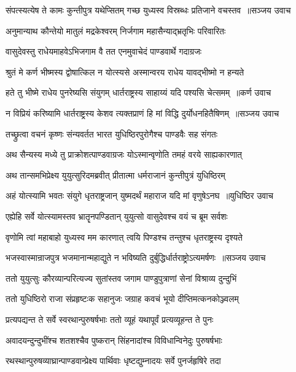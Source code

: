 \threelineshloka
{संपत्स्यत्येष ते कामः कुन्तीपुत्र यथेप्सितम्}
{गच्छ युध्यस्व विस्रब्धः प्रतिजाने वचस्तव ॥सञ्जय उवाच}
{}


\twolineshloka
{अनुमान्याथ कौन्तेयो मातुलं मद्रकेश्वरम्}
{निर्जगाम महासैन्याद्भ्रतृभिः परिवारितः}


\twolineshloka
{वासुदेवस्तु राधेयमाहवेऽभिजगाम वै}
{तत एनमुवाचेदं पाण्डवार्थे गदाग्रजः}


\twolineshloka
{श्रुतं मे कर्ण भीष्मस्य द्वोषात्किल न योत्स्यसे}
{अस्मान्वरय राधेय यावद्भीष्मो न हन्यते}


\threelineshloka
{हते तु भीष्मे राधेय पुनरेष्यसि संयुगम्}
{धार्तराष्ट्रस्य साहाय्यं यदि पश्यसि चेत्समम् ॥कर्ण उवाच}
{}


\threelineshloka
{न विप्रियं करिष्यामि धार्तराष्ट्रस्य केशव}
{त्यक्तप्राणं हि मां विद्धि दुर्योधनहितैषिणम् ॥सञ्जय उवाच}
{}


\twolineshloka
{तच्छ्रुत्वा वचनं कृष्णः संन्यवर्तत भारत}
{युधिष्ठिरपुरोगैश्च पाण्डवैः सह संगतः}


\twolineshloka
{अथ सैन्यस्य मध्ये तु प्राक्रोशत्पाण्डवाग्रजः}
{योऽस्मान्वृणोति तमहं वरये साह्यकारणात्}


\twolineshloka
{अथ तान्समभिप्रेक्ष्य युयुत्सुरिदमब्रवीत्}
{प्रीतात्मा धर्मराजानं कुन्तीपुत्रं युधिष्ठिरम्}


\threelineshloka
{अहं योत्स्यामि भवतः संयुगे धृतराष्ट्रजान्}
{युष्मदर्थं महाराज यदि मां वृणुषेऽनघ ॥युधिष्ठिर उवाच}
{}


\twolineshloka
{एह्येहि सर्वे योत्स्यामस्तव भ्रातॄनपण्डितान्}
{युयुत्सो वासुदेवश्च वयं च ब्रूम सर्वशः}


\twolineshloka
{वृणोमि त्वां महाबाहो युध्यस्व मम कारणात्}
{त्वयि पिण्डश्च तन्तुश्च धृतराष्ट्रस्य दृश्यते}


\threelineshloka
{भजस्वास्मान्राजपुत्र भजमानान्महाद्युते}
{न भविष्यति दुर्बुद्धिर्धार्तराष्ट्रोऽत्यमर्षणः ॥सञ्जय उवाच}
{}


\twolineshloka
{ततो युयुत्सुः कौरव्यान्परित्यज्य सुतांस्तव}
{जगाम पाण्डुपुत्राणां सेनां विश्राव्य दुन्दुभिं}


\twolineshloka
{ततो युधिष्ठिरो राजा संप्रहृष्टःक सहानुजः}
{जग्राह कवचं भूयो दीप्तिमत्कनकोञ्ज्वलम्}


\twolineshloka
{प्रत्यपद्यन्त ते सर्वे स्वरथान्पुरुषर्षभाः}
{ततो व्यूहं यथापूर्वं प्रत्यव्यूहन्त ते पुनः}


\twolineshloka
{अवादयन्दुन्दुभींश्च शतशश्चैव पुष्करान्}
{सिंहनादांश्च विविधान्विनेदुः पुरुषर्षभाः}


\twolineshloka
{रथस्थान्पुरुषव्याघ्रान्पाण्डवान्प्रेक्ष्य पार्थिवाः}
{धृष्टद्युम्नादयः सर्वे पुनर्जहृषिरे तदा}


